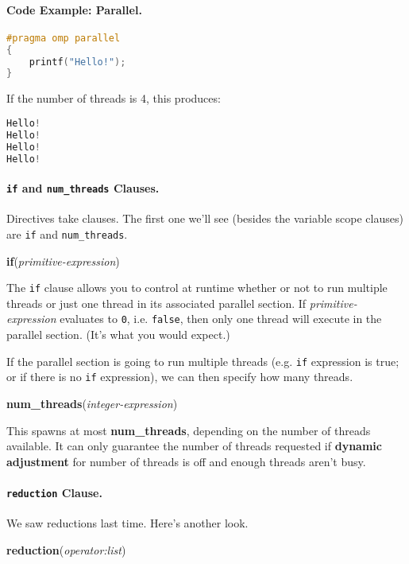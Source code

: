 \paragraph{Code Example: Parallel.}
  \begin{lstlisting}[language=C]
#pragma omp parallel
{
    printf("Hello!");
}
  \end{lstlisting}

  If the number of threads is 4, this produces:
  \begin{lstlisting}[language=C]
Hello!
Hello!
Hello!
Hello!
  \end{lstlisting}

\paragraph{{\tt if} and {\tt num\_threads} Clauses.} Directives take clauses.
The first one we'll see (besides the variable scope clauses) are {\tt if} and
{\tt num\_threads}.

  \begin{center}
    {\bf if}({\it primitive-expression})    
  \end{center}
The {\tt if} clause allows you to control at runtime whether or not to run
multiple threads or just one thread in its associated parallel section.
If {\it primitive-expression} evaluates to {\tt 0}, i.e. {\tt false}, then
only one thread will execute in the parallel section. (It's what you would expect.)

\newpage
If the parallel section is going to run multiple threads (e.g. {\tt if} expression
is true; or if there is no {\tt if} expression), we can then specify how many threads.
  \begin{center}
    {\bf num\_threads}({\it integer-expression})    
  \end{center}

This spawns at most {\bf num\_threads}, depending on the number of
threads available.  It can only guarantee the number of threads
requested if {\bf dynamic adjustment} for number of threads is off and
enough threads aren't busy.

\paragraph{{\tt reduction} Clause.} We saw reductions last time. Here's
another look.
  \begin{center}
    {\bf reduction}({\it operator:list})
  \end{center}

